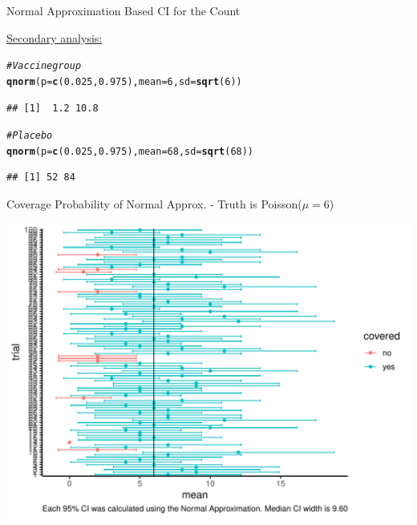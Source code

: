 \documentclass[10pt]{beamer}\usepackage[]{graphicx}\usepackage[]{color}
\makeatletter
\def\maxwidth{ %
  \ifdim\Gin@nat@width>\linewidth
    \linewidth
  \else
    \Gin@nat@width
  \fi
}
\newcommand{\hlnum}[1]{\textcolor[rgb]{0.686,0.059,0.569}{#1}}%
\newcommand{\hlcom}[1]{\textcolor[rgb]{0.678,0.584,0.686}{\textit{#1}}}%
\newcommand{\hlstd}[1]{\textcolor[rgb]{0.345,0.345,0.345}{#1}}%
\newcommand{\hlkwc}[1]{\textcolor[rgb]{0.333,0.667,0.333}{#1}}%
\newcommand{\hlkwd}[1]{\textcolor[rgb]{0.737,0.353,0.396}{\textbf{#1}}}%
\newenvironment{kframe}{%
 \def\at@end@of@kframe{}%
 \ifinner\ifhmode%
  \def\at@end@of@kframe{\end{minipage}}%
  \begin{minipage}{\columnwidth}%
 \fi\fi%
 \def\FrameCommand##1{\hskip\@totalleftmargin \hskip-\fboxsep
 \colorbox{shadecolor}{##1}\hskip-\fboxsep
     \hskip-\linewidth \hskip-\@totalleftmargin \hskip\columnwidth}%
 \MakeFramed {\advance\hsize-\width
   \@totalleftmargin\z@ \linewidth\hsize
   \@setminipage}}%
 {\par\unskip\endMakeFramed%
 \at@end@of@kframe}
\newenvironment{knitrout}{}{} %
\makeatother
\begin{document}
\begin{frame}[fragile]{Normal Approximation Based CI for the Count}
	
	\underline{Secondary analysis:}
	\vspace{0.1in}
\begin{knitrout}\tiny
{}\color{fgcolor}\begin{kframe}
\begin{alltt}
\hlcom{# Vaccine group}
\hlkwd{qnorm}\hlstd{(}\hlkwc{p} \hlstd{=} \hlkwd{c}\hlstd{(}\hlnum{0.025}\hlstd{,} \hlnum{0.975}\hlstd{),} \hlkwc{mean} \hlstd{=} \hlnum{6}\hlstd{,} \hlkwc{sd} \hlstd{=} \hlkwd{sqrt}\hlstd{(}\hlnum{6}\hlstd{))}
\end{alltt}
\begin{verbatim}
## [1]  1.2 10.8
\end{verbatim}
\begin{alltt}
\hlcom{# Placebo}
\hlkwd{qnorm}\hlstd{(}\hlkwc{p} \hlstd{=} \hlkwd{c}\hlstd{(}\hlnum{0.025}\hlstd{,} \hlnum{0.975}\hlstd{),} \hlkwc{mean} \hlstd{=} \hlnum{68}\hlstd{,} \hlkwc{sd} \hlstd{=} \hlkwd{sqrt}\hlstd{(}\hlnum{68}\hlstd{))}
\end{alltt}
\begin{verbatim}
## [1] 52 84
\end{verbatim}
\end{kframe}
\end{knitrout}
	
\end{frame}


\begin{frame}[fragile]{Coverage Probability of Normal Approx. - Truth is Poisson($\mu=6$)}
	
\begin{knitrout}\tiny
{}\color{fgcolor}

{\centering \includegraphics[width=\maxwidth]{figure/unnamed-chunk-4-1} 

}



\end{knitrout}
	
\end{frame}
\end{document}
